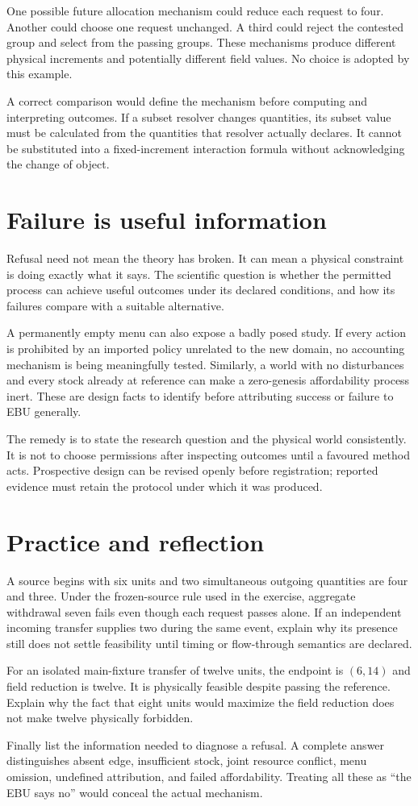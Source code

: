 One possible future allocation mechanism could reduce each request to four. Another could choose one request unchanged. A third could reject the contested group and select from the passing groups. These mechanisms produce different physical increments and potentially different field values. No choice is adopted by this example.

A correct comparison would define the mechanism before computing and interpreting outcomes. If a subset resolver changes quantities, its subset value must be calculated from the quantities that resolver actually declares. It cannot be substituted into a fixed-increment interaction formula without acknowledging the change of object.

\section{Failure is useful information}
Refusal need not mean the theory has broken. It can mean a physical constraint is doing exactly what it says. The scientific question is whether the permitted process can achieve useful outcomes under its declared conditions, and how its failures compare with a suitable alternative.

A permanently empty menu can also expose a badly posed study. If every action is prohibited by an imported policy unrelated to the new domain, no accounting mechanism is being meaningfully tested. Similarly, a world with no disturbances and every stock already at reference can make a zero-genesis affordability process inert. These are design facts to identify before attributing success or failure to EBU generally.

The remedy is to state the research question and the physical world consistently. It is not to choose permissions after inspecting outcomes until a favoured method acts. Prospective design can be revised openly before registration; reported evidence must retain the protocol under which it was produced.

\section{Practice and reflection}
A source begins with six units and two simultaneous outgoing quantities are four and three. Under the frozen-source rule used in the exercise, aggregate withdrawal seven fails even though each request passes alone. If an independent incoming transfer supplies two during the same event, explain why its presence still does not settle feasibility until timing or flow-through semantics are declared.

For an isolated main-fixture transfer of twelve units, the endpoint is \((6,14)\) and field reduction is twelve. It is physically feasible despite passing the reference. Explain why the fact that eight units would maximize the field reduction does not make twelve physically forbidden.

Finally list the information needed to diagnose a refusal. A complete answer distinguishes absent edge, insufficient stock, joint resource conflict, menu omission, undefined attribution, and failed affordability. Treating all these as ``the EBU says no'' would conceal the actual mechanism.
